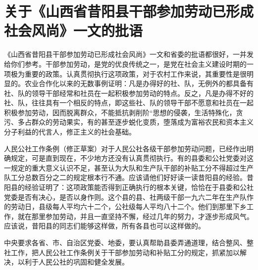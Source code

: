 \section[关于《山西省昔阳县干部参加劳动已形成社会风尚》一文的批语（一九六三年五月）]{关于《山西省昔阳县干部参加劳动已形成社会风尚》一文的批语}


《山西省昔阳县干部参加劳动已形成社会风尚》一文和省委的批语都很好，一并发给你们参考。干部参加劳动，是党的优良传统之一，是党在社会主义建设时期的一项极为重要的政策。认真贯彻执行这项政策，对于农村工作来说，其重要性是很明显的。农业合作化以来的无数事例证明：凡是办得好的社、队，无例外的都具备有社、队的领导干部经常和社员在一起积极参加劳动的特点。反之，凡是办得不好的社、队，往往具有一个相反的特点，即这些社、队的领导干部不愿意和社员在一起积极参加劳动，因而脱离群众，不能抵抗剥削阶“思想的侵袭，生活特殊化，贪污、多占群众的劳动果实，有的甚至逐步蜕化变质，堕落成为富裕农民和资本主义分子利益的代言人，修正主义的社会基础。

人民公社工作条例（修正草案）对于人民公社各级干部参加劳动问题，已经作出明确规定，可是直到现在，不少地方还没有认真贯彻执行。有的县委和公社党委对这一规定的重大意义认识不足，甚至认为大队和生产队干部的补贴工分不得超过生产队工分总数百分之二的规定根本行不通。应该请他们好好读一读昔阳县的经验。昔阳县的经验证明了：这项政策能否得到正确执行的根本关键，恰恰在于县委和公社党委是否有决心，是否以身作则。这个县的县、社两级干部一九六二年在生产队作的劳动日，县级每人平均六十二个，公社级每人平均八十二个。他们到那里下乡工作，就在那里参加劳动，并且一直坚持不懈，经过几年的努力，才逐步形成风气。应该说，昔阳县的同志们能够这样做，所有各县也可以这样做的。

中央要求各省、市、自治区党委、地委，要认真帮助县委弄通道理，结合整风、整社工作，把人民公社工作条例关于干部参加劳动和补贴工分的规定，抓紧加以解决，以利于人民公社的巩固和健全发展。


